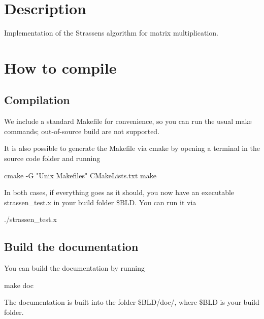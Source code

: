 \hypertarget{index_sec_description}{}\section{Description}\label{index_sec_description}
Implementation of the Strassen\textquotesingle{}s algorithm for matrix multiplication.\hypertarget{index_sec_compile}{}\section{How to compile}\label{index_sec_compile}
\hypertarget{index_sec_compilation}{}\subsection{Compilation}\label{index_sec_compilation}
We include a standard {\ttfamily Makefile} for convenience, so you can run the usual {\ttfamily make} commands; out-\/of-\/source build are not supported.

It is also possible to generate the {\ttfamily Makefile} via {\ttfamily cmake} by opening a terminal in the source code folder and running \begin{DoxyVerb}cmake -G "Unix Makefiles" CMakeLists.txt
make
\end{DoxyVerb}


In both cases, if everything goes as it should, you now have an executable {\ttfamily strassen\+\_\+test.\+x} in your build folder {\ttfamily \$\+B\+LD}. You can run it via \begin{DoxyVerb}./strassen_test.x
\end{DoxyVerb}
\hypertarget{index_sec_builddoc}{}\subsection{Build the documentation}\label{index_sec_builddoc}
You can build the documentation by running \begin{DoxyVerb}make doc
\end{DoxyVerb}


The documentation is built into the folder {\ttfamily \$\+B\+LD/doc/}, where {\ttfamily \$\+B\+LD} is your build folder. 